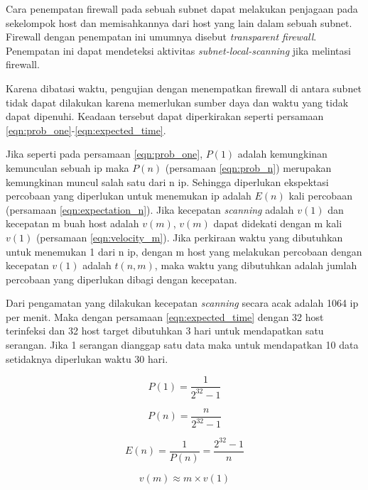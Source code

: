 Cara penempatan firewall pada sebuah subnet dapat melakukan penjagaan pada sekelompok host dan memisahkannya dari host yang lain dalam sebuah subnet. Firewall dengan penempatan ini umumnya disebut \textit{transparent firewall}. Penempatan ini dapat mendeteksi aktivitas \textit{subnet-local-scanning} jika melintasi firewall.

Karena dibatasi waktu, pengujian dengan menempatkan firewall di antara subnet tidak dapat dilakukan karena memerlukan sumber daya dan waktu yang tidak dapat dipenuhi.  Keadaan tersebut dapat diperkirakan seperti persamaan \ref{eqn:prob_one}-\ref{eqn:expected_time}.

Jika seperti pada persamaan \ref{eqn:prob_one}, $P(1)$ adalah kemungkinan kemunculan sebuah ip maka $P(n)$ (persamaan \ref{eqn:prob_n}) merupakan kemungkinan muncul salah satu dari n ip. Sehingga diperlukan ekspektasi percobaan yang diperlukan untuk menemukan ip adalah $E(n)$ kali percobaan (persamaan \ref{eqn:expectation_n}). Jika kecepatan \textit{scanning} adalah $v(1)$ dan kecepatan m buah host adalah $v(m)$, $v(m)$ dapat didekati dengan m kali $v(1)$ (persamaan \ref{eqn:velocity_m}). Jika perkiraan waktu yang dibutuhkan untuk menemukan 1 dari n ip, dengan m host yang melakukan percobaan dengan kecepatan $v(1)$ adalah $t(n,m)$, maka waktu yang dibutuhkan adalah jumlah percobaan yang diperlukan dibagi dengan kecepatan.

Dari pengamatan yang dilakukan kecepatan \textit{scanning} secara acak adalah 1064 ip per menit. Maka dengan persamaan \ref{eqn:expected_time} dengan 32 host terinfeksi dan 32 host target dibutuhkan 3 hari untuk mendapatkan satu serangan. Jika 1 serangan dianggap satu data maka untuk mendapatkan 10 data setidaknya diperlukan waktu 30 hari.

\begin{equation}
\label{eqn:prob_one}
P(1) = \frac{1}{2^{32}-1}
\end{equation}

\begin{equation}
\label{eqn:prob_n}
P(n) = \frac {n}{2^{32}-1}
\end{equation}

\begin{equation}
\label{eqn:expectation_n}
E(n) = \frac{1}{P(n)} = \frac{2^{32}-1}{n}
\end{equation}

\begin{equation}
\label{eqn:velocity_m}
v(m) \approx m \times v(1)
\end{equation}

